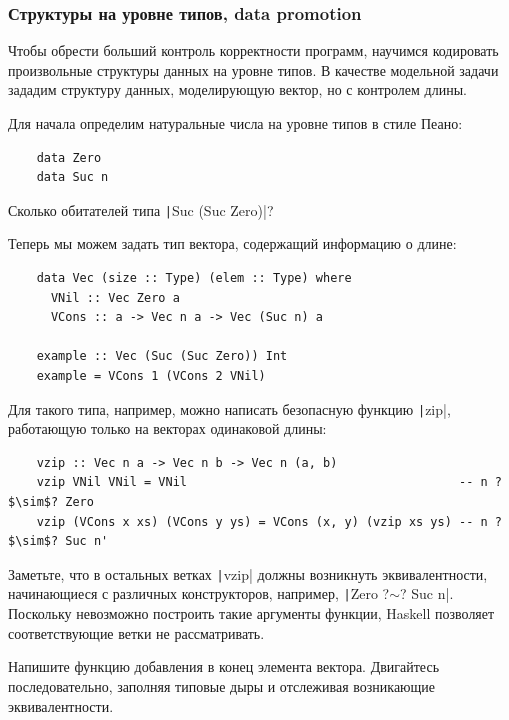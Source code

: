 \subsubsection{Структуры на уровне типов, data promotion} \label{subsubsec:promotion}

Чтобы обрести больший контроль корректности программ, научимся кодировать произвольные структуры данных на уровне типов.
В качестве модельной задачи зададим структуру данных, моделирующую вектор, но с контролем длины.

Для начала определим натуральные числа на уровне типов в стиле Пеано:
\begin{verbatim}
    data Zero
    data Suc n
\end{verbatim}

\begin{task}
    Сколько обитателей типа \texttt|Suc (Suc Zero)|?
\end{task}

Теперь мы можем задать тип вектора, содержащий информацию о длине:
\begin{verbatim}
    data Vec (size :: Type) (elem :: Type) where
      VNil :: Vec Zero a
      VCons :: a -> Vec n a -> Vec (Suc n) a

    example :: Vec (Suc (Suc Zero)) Int
    example = VCons 1 (VCons 2 VNil)
\end{verbatim}

Для такого типа, например, можно написать безопасную функцию \texttt|zip|, работающую только на векторах одинаковой длины:
\begin{verbatim}
    vzip :: Vec n a -> Vec n b -> Vec n (a, b)
    vzip VNil VNil = VNil                                      -- n ?$\sim$? Zero
    vzip (VCons x xs) (VCons y ys) = VCons (x, y) (vzip xs ys) -- n ?$\sim$? Suc n'
\end{verbatim}

Заметьте, что в остальных ветках \texttt|vzip| должны возникнуть эквивалентности, начинающиеся с различных конструкторов, например, \texttt|Zero ?$\sim$? Suc n|.
Поскольку невозможно построить такие аргументы функции, Haskell позволяет соответствующие ветки не рассматривать.

\begin{task}
    Напишите функцию добавления в конец элемента вектора.
    Двигайтесь последовательно, заполняя типовые дыры и отслеживая возникающие эквивалентности.
\end{task}

